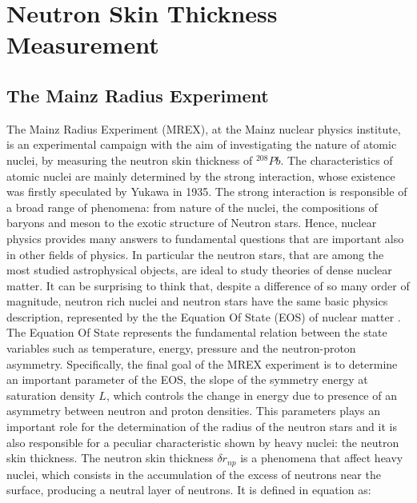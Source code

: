 
\chapter{Neutron Skin Thickness Measurement} \label{intro}

\section{The Mainz Radius Experiment}

The Mainz Radius Experiment (MREX), at the Mainz nuclear physics institute, is an experimental campaign with the aim of investigating the nature of atomic nuclei, by measuring the neutron skin thickness of $^{208}Pb$. The characteristics of atomic nuclei are mainly determined by the strong interaction, whose existence was firstly speculated by Yukawa in 1935. The strong interaction is responsible of a broad range of phenomena: from nature of the nuclei, the compositions of baryons and meson to the exotic structure of Neutron stars. Hence, nuclear physics provides many answers to fundamental questions that are important also in other fields of physics. In particular the neutron stars, that are among the most studied astrophysical objects, are ideal to study theories of dense nuclear matter. 
It can be surprising to think that, despite a difference of so many order of magnitude, neutron rich nuclei and neutron stars have the same basic physics description, represented by the the Equation Of State (EOS) of nuclear matter \cite{Thiel_2019}. The Equation Of State represents the fundamental relation between the state variables such as temperature, energy, pressure and the neutron-proton asymmetry. Specifically, the final goal of the MREX experiment is to determine an important parameter of the EOS, the slope of the symmetry energy at saturation density $L$, which controls the change in energy due to presence of an asymmetry between neutron and proton densities. This parameters plays an important role for the determination of the radius of the neutron stars and it is also responsible for a peculiar characteristic shown by heavy nuclei: the neutron skin thickness. The neutron skin thickness $\delta r_{np}$ is a phenomena that affect heavy nuclei, which consists in the accumulation of the excess of neutrons near the surface, producing a neutral layer of neutrons. It is defined in equation as: 

